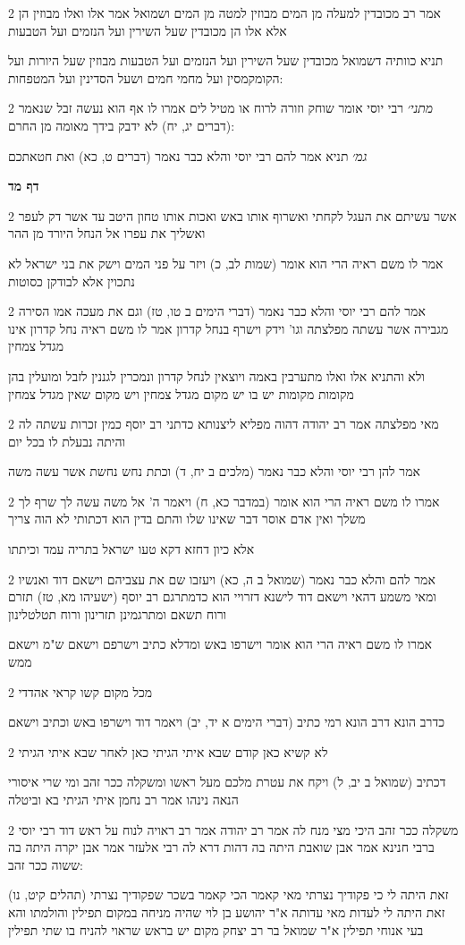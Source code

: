 \documentclass[12pt, openany]{book}
\newcommand{\sethebfont}{
\fontsize{10.5pt}{21.0pt} \selectfont
}
\newcommand{\twocol}[1]{
	{\sethebfont \begin{multicols}{2}
			#1
	\end{multicols}}	
}
\newcommand{\sectname}{}
\newcommand{\newsection}[1]{
	\addcontentsline{toc}{section}{#1}
	\renewcommand{\sectname}{#1}	
	\vspace{-\baselineskip}
	\begin{center}
		\textbf{%
\fontsize{16pt}{16pt}\selectfont
			#1}
	\end{center}
	\vspace{-\baselineskip}
	\nopagebreak
}
\begin{document}
\twocol{אמר רב מכובדין למעלה מן המים מבוזין למטה מן המים ושמואל אמר אלו ואלו מבוזין הן אלא אלו הן מכובדין שעל השירין ועל הנזמים ועל הטבעות
\par תניא כוותיה דשמואל מכובדין שעל השירין ועל הנזמים ועל הטבעות מבוזין שעל היורות ועל הקומקמסין ועל מחמי חמים ושעל הסדינין ועל המטפחות:}
\twocol{{\large\emph{מתני׳}} רבי יוסי אומר שוחק וזורה לרוח או מטיל לים אמרו לו אף הוא נעשה זבל שנאמר (דברים יג, יח) לא ידבק בידך מאומה מן החרם:
\par {\large\emph{גמ׳}} תניא אמר להם רבי יוסי והלא כבר נאמר (דברים ט, כא) ואת חטאתכם}
\newsection{דף מד}
\twocol{אשר עשיתם את העגל לקחתי ואשרוף אותו באש ואכות אותו טחון היטב עד אשר דק לעפר ואשליך את עפרו אל הנחל היורד מן ההר
\par אמר לו משם ראיה הרי הוא אומר (שמות לב, כ) ויזר על פני המים וישק את בני ישראל לא נתכוין אלא לבודקן כסוטות}
\twocol{אמר להם רבי יוסי והלא כבר נאמר (דברי הימים ב טו, טז) וגם את מעכה אמו הסירה מגבירה אשר עשתה מפלצתה וגו' וידק וישרף בנחל קדרון אמר לו משם ראיה נחל קדרון אינו מגדל צמחין
\par ולא והתניא אלו ואלו מתערבין באמה ויוצאין לנחל קדרון ונמכרין לגננין לזבל ומועלין בהן מקומות מקומות יש בו יש מקום מגדל צמחין ויש מקום שאין מגדל צמחין}
\twocol{מאי מפלצתה אמר רב יהודה דהוה מפליא ליצנותא כדתני רב יוסף כמין זכרות עשתה לה והיתה נבעלת לו בכל יום
\par אמר להן רבי יוסי והלא כבר נאמר (מלכים ב יח, ד) וכתת נחש נחשת אשר עשה משה}
\twocol{אמרו לו משם ראיה הרי הוא אומר (במדבר כא, ח) ויאמר ה' אל משה עשה לך שרף לך משלך ואין אדם אוסר דבר שאינו שלו והתם בדין הוא דכתותי לא הוה צריך
\par אלא כיון דחזא דקא טעו ישראל בתריה עמד וכיתתו}
\twocol{אמר להם והלא כבר נאמר (שמואל ב ה, כא) ויעזבו שם את עצביהם וישאם דוד ואנשיו ומאי משמע דהאי וישאם דוד לישנא דזרויי הוא כדמתרגם רב יוסף (ישעיהו מא, טז) תזרם ורוח תשאם ומתרגמינן תזרינון ורוח תטלטלינון
\par אמרו לו משם ראיה הרי הוא אומר וישרפו באש ומדלא כתיב וישרפם וישאם ש"מ וישאם ממש}
\twocol{מכל מקום קשו קראי אהדדי
\par כדרב הונא דרב הונא רמי כתיב (דברי הימים א יד, יב) ויאמר דוד וישרפו באש וכתיב וישאם}
\twocol{לא קשיא כאן קודם שבא איתי הגיתי כאן לאחר שבא איתי הגיתי
\par דכתיב (שמואל ב יב, ל) ויקח את עטרת מלכם מעל ראשו ומשקלה ככר זהב ומי שרי איסורי הנאה נינהו אמר רב נחמן איתי הגיתי בא וביטלה}
\twocol{משקלה ככר זהב היכי מצי מנח לה אמר רב יהודה אמר רב ראויה לנוח על ראש דוד רבי יוסי ברבי חנינא אמר אבן שואבת היתה בה דהות דרא לה רבי אלעזר אמר אבן יקרה היתה בה ששוה ככר זהב:
\par (תהלים קיט, נו) זאת היתה לי כי פקודיך נצרתי מאי קאמר הכי קאמר בשכר שפקודיך נצרתי זאת היתה לי לעדות מאי עדותה א"ר יהושע בן לוי שהיה מניחה במקום תפילין והולמתו והא בעי אנוחי תפילין א"ר שמואל בר רב יצחק מקום יש בראש שראוי להניח בו שתי תפילין}
\end{document}
